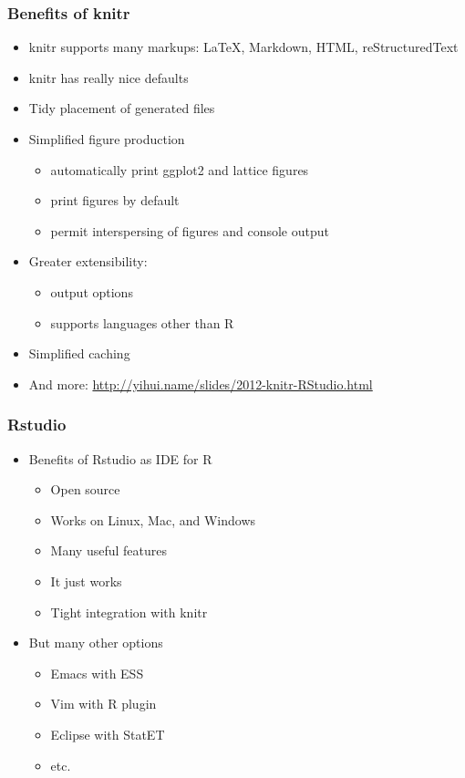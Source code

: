 \begin{frame}[fragile]\frametitle{Benefits of knitr}

\begin{itemize}
\item
  knitr supports many markups: LaTeX, Markdown, HTML, reStructuredText
\item
  knitr has really nice defaults
\item
  Tidy placement of generated files
\item
  Simplified figure production

  \begin{itemize}
  \item
    automatically print ggplot2 and lattice figures
  \item
    print figures by default
  \item
    permit interspersing of figures and console output
  \end{itemize}
\item
  Greater extensibility:

  \begin{itemize}
  \item
    output options
  \item
    supports languages other than R
  \end{itemize}
\item
  Simplified caching
\item
  And more: \url{http://yihui.name/slides/2012-knitr-RStudio.html}
\end{itemize}

\end{frame}

\begin{frame}\frametitle{Rstudio}

\begin{itemize}
\item
  Benefits of Rstudio as IDE for R

  \begin{itemize}
  \item
    Open source
  \item
    Works on Linux, Mac, and Windows
  \item
    Many useful features
  \item
    It just works
  \item
    Tight integration with knitr
  \end{itemize}
\item
  But many other options

  \begin{itemize}
  \item
    Emacs with ESS
  \item
    Vim with R plugin
  \item
    Eclipse with StatET
  \item
    etc.
  \end{itemize}
\end{itemize}

\end{frame}


